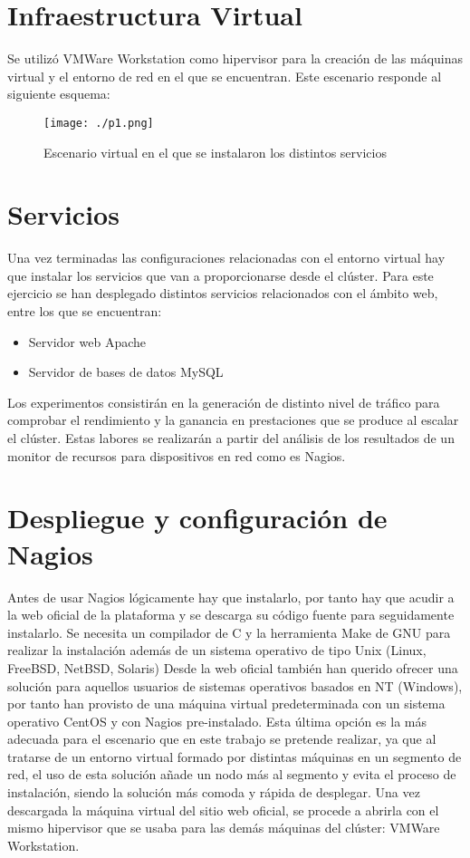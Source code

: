 \documentclass[paper=a4, fontsize=12pt]{scrartcl} %
\begin{document}
\section{Infraestructura Virtual}

Se utilizó VMWare Workstation como hipervisor para la creación de las máquinas virtual y el entorno de red en el que se encuentran. Este escenario responde al siguiente esquema:

\begin{figure}[H] %
	\centering
	\label{lsblk}
	\texttt{[image: ./p1.png]}
	\caption{Escenario virtual en el que se instalaron los distintos servicios} 
\end{figure}


\section{Servicios}

Una vez terminadas las configuraciones relacionadas con el entorno virtual hay que instalar los servicios que van a proporcionarse desde el clúster. Para este ejercicio se han desplegado distintos servicios relacionados con el ámbito web, entre los que se encuentran:
\begin{itemize}
	\item Servidor web Apache
	\item Servidor de bases de datos MySQL
\end{itemize}

Los experimentos consistirán en la generación de distinto nivel de tráfico para comprobar el rendimiento y la ganancia en prestaciones que se produce al escalar el clúster. Estas labores se realizarán a partir del análisis de los resultados de un monitor de recursos para dispositivos en red como es Nagios.

\section{Despliegue y configuración de Nagios}

Antes de usar Nagios lógicamente hay que instalarlo, por tanto hay que acudir a la web oficial de la plataforma y se descarga su código fuente para seguidamente instalarlo. Se necesita un compilador de C y la herramienta Make de GNU para realizar la instalación además de un sistema operativo de tipo Unix (Linux, FreeBSD, NetBSD, Solaris) \cite{p1}
Desde la web oficial también han querido ofrecer una solución para aquellos usuarios de sistemas operativos basados en NT (Windows), por tanto han provisto de una máquina virtual predeterminada con un sistema operativo CentOS y con Nagios pre-instalado.
Esta última opción es la más adecuada para el escenario que en este trabajo se pretende realizar, ya que al tratarse de un entorno virtual formado por distintas máquinas en un segmento de red, el uso de esta solución añade un nodo más al segmento y evita el proceso de instalación, siendo la solución más comoda y rápida de desplegar. \cite{p2}
Una vez descargada la máquina virtual del sitio web oficial, se procede a abrirla con el mismo hipervisor que se usaba para las demás máquinas del clúster: VMWare Workstation.
\end{document}
